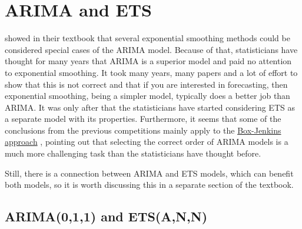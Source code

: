 \documentclass[
]{book}
\theoremstyle{definition}
\theoremstyle{definition}
\theoremstyle{definition}
\theoremstyle{definition}
\theoremstyle{remark}
\begin{document}
\hypertarget{ARIMAandETS}{%
\section{ARIMA and ETS}\label{ARIMAandETS}}

\citet{Box1976} showed in their textbook that several exponential smoothing methods could be considered special cases of the ARIMA model. Because of that, statisticians have thought for many years that ARIMA is a superior model and paid no attention to exponential smoothing. It took many years, many papers and a lot of effort \citep{Makridakis1982, Fildes1998, Makridakis2000} to show that this is not correct and that if you are interested in forecasting, then exponential smoothing, being a simpler model, typically does a better job than ARIMA. It was only after \citet{Ord1997} that the statisticians have started considering ETS as a separate model with its properties. Furthermore, it seems that some of the conclusions from the previous competitions mainly apply to the \protect\hyperlink{BJApproach}{Box-Jenkins approach} \citep[for example, see][]{Makridakis1997}, pointing out that selecting the correct order of ARIMA models is a much more challenging task than the statisticians have thought before.

Still, there is a connection between ARIMA and ETS models, which can benefit both models, so it is worth discussing this in a separate section of the textbook.

\hypertarget{ARIMAETS011}{%
\subsection{ARIMA(0,1,1) and ETS(A,N,N)}\label{ARIMAETS011}}
\end{document}
